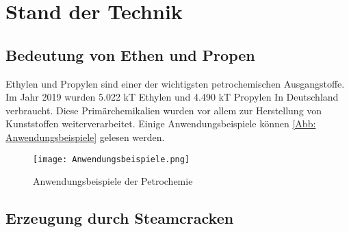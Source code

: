 \documentclass[12pt,a4paper,bibtotocnumbered,liststotocnumbered]{scrreprt}
\begin{document}
\chapter{Stand der Technik}

\section{Bedeutung von Ethen und Propen}
Ethylen und Propylen sind einer der wichtigsten petrochemischen Ausgangstoffe.  Im Jahr 2019 wurden 5.022 kT Ethylen und 4.490 kT Propylen In Deutschland verbraucht. \cite{Hohmann} Diese Primärchemikalien wurden vor allem zur Herstellung von Kunststoffen weiterverarbeitet. Einige Anwendungsbeispiele können \autoref{Abb: Anwendungsbeispiele} gelesen werden. 


\begin{figure}[H]
\begin{center}
\texttt{[image: Anwendungsbeispiele.png]}
\caption{Anwendungsbeispiele der Petrochemie \cite{Kuhlmann}}
\label{Abb: Anwendungsbeispiele}
\end{center}
\end{figure}

\section{Erzeugung durch Steamcracken}
\end{document}
